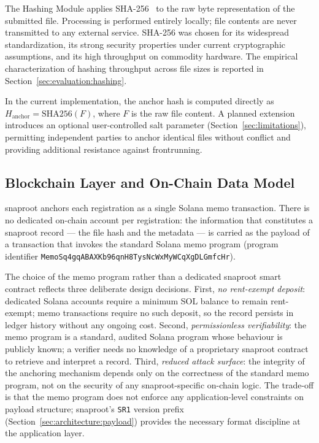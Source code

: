 \documentclass[11pt,a4paper]{article}
\begin{document}
The Hashing Module applies SHA-256~\cite{nist2015fips180} to the raw
byte representation of the submitted file. Processing is performed
entirely locally; file contents are never transmitted to any external
service. SHA-256 was chosen for its widespread standardization, its
strong security properties under current cryptographic assumptions,
and its high throughput on commodity hardware. The empirical
characterization of hashing throughput across file sizes is reported in
Section~\ref{sec:evaluation:hashing}.

In the current implementation, the anchor hash is computed directly as
$H_{\text{anchor}} = \mathrm{SHA256}(F)$, where $F$ is the raw file
content. A planned extension introduces an optional user-controlled
salt parameter (Section~\ref{sec:limitations}), permitting independent
parties to anchor identical files without conflict and providing
additional resistance against frontrunning.

\subsection{Blockchain Layer and On-Chain Data Model}
\label{sec:architecture:onchain}

snaproot anchors each registration as a single Solana memo transaction.
There is no dedicated on-chain account per registration: the
information that constitutes a snaproot record --- the file hash and
the metadata --- is carried as the payload of a transaction that
invokes the standard Solana memo program (program identifier
\texttt{MemoSq4gqABAXKb96qnH8TysNcWxMyWCqXgDLGmfcHr}).

The choice of the memo program rather than a dedicated snaproot smart
contract reflects three deliberate design decisions. First,
\emph{no rent-exempt deposit}: dedicated Solana accounts require a
minimum SOL balance to remain rent-exempt; memo transactions require
no such deposit, so the record persists in ledger history without
any ongoing cost. Second, \emph{permissionless verifiability}: the
memo program is a standard, audited Solana program whose behaviour is
publicly known; a verifier needs no knowledge of a proprietary
snaproot contract to retrieve and interpret a record. Third,
\emph{reduced attack surface}: the integrity of the anchoring
mechanism depends only on the correctness of the standard memo
program, not on the security of any snaproot-specific on-chain logic.
The trade-off is that the memo program does not enforce any
application-level constraints on payload structure; snaproot's
\texttt{SR1} version prefix (Section~\ref{sec:architecture:payload})
provides the necessary format discipline at the application layer.
\end{document}
